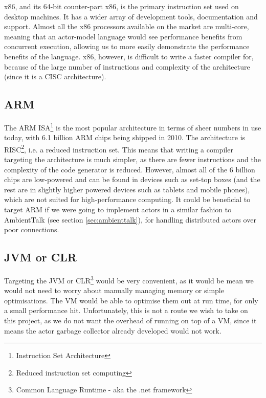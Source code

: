 \documentclass[11pt,a4paper]{report}
\begin{document}
x86, and its 64-bit counter-part x86\cite{intel-x86}, is the primary instruction set used on desktop machines.
It has a wider array of development tools, documentation and support.
Almost all the x86 processors available on the market are multi-core, meaning that an actor-model language would see performance benefits from concurrent execution, allowing us to more easily demonstrate the performance benefits of the language.
x86, however, is difficult to write a faster compiler for, because of the large number of instructions and complexity of the architecture (since it is a CISC architecture).

\subsection{ARM}

The ARM ISA\footnote{Instruction Set Architecture} is the most popular architecture in terms of sheer numbers in use today, with 6.1 billion ARM chips being shipped in 2010\cite{theregister2011}.
The architecture is RISC\footnote{Reduced instruction set computing}, i.e. a reduced instruction set.
This means that writing a compiler targeting the architecture is much simpler, as there are fewer instructions and the complexity of the code generator is reduced.
However, almost all of the 6 billion chips are low-powered and can be found in devices such as set-top boxes (and the rest are in slightly higher powered devices such as tablets and mobile phones), which are not suited for high-performance computing.
It could be beneficial to target ARM if we were going to implement actors in a similar fashion to AmbientTalk (see section \ref{sec:ambienttalk}), for handling distributed actors over poor connections.

\subsection{JVM or CLR}

Targeting the JVM or CLR\footnote{Common Language Runtime - aka the .net framework} would be very convenient, as it would be mean we would not need to worry about manually managing memory or simple optimisations. 
The VM would be able to optimise them out at run time, for only a small performance hit.
Unfortunately, this is not a route we wish to take on this project, as we do not want the overhead of running on top of a VM, since it means the actor garbage collector already developed would not work.
\end{document}
